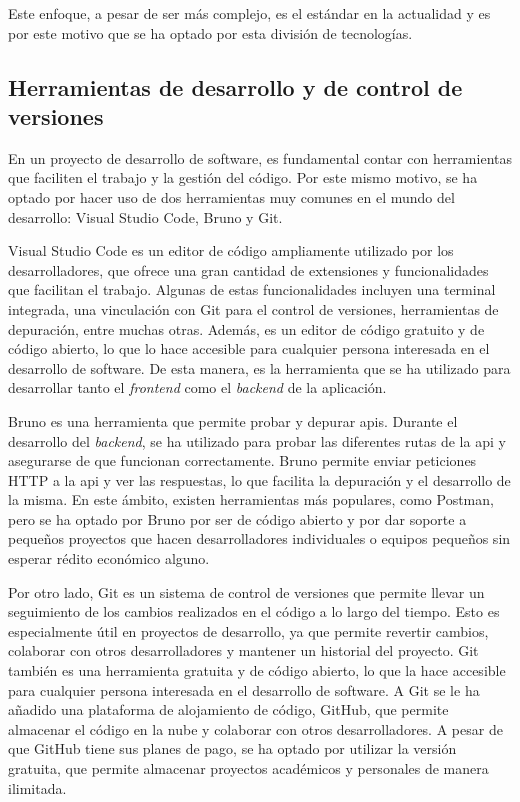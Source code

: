 Este enfoque, a pesar de ser más complejo, es el estándar en la actualidad y es por este motivo que se ha optado por esta división de tecnologías.

\subsection{Herramientas de desarrollo y de control de versiones}
\label{dev:subsec:herramientas_desarrollo}

En un proyecto de desarrollo de software, es fundamental contar con herramientas que faciliten el trabajo y la gestión del código. Por este mismo motivo, se ha optado por hacer uso de dos herramientas muy comunes en el mundo del desarrollo: Visual Studio Code, Bruno y Git.

Visual Studio Code es un editor de código ampliamente utilizado por los desarrolladores, que ofrece una gran cantidad de extensiones y funcionalidades que facilitan el trabajo. Algunas de estas funcionalidades incluyen una terminal integrada, una vinculación con Git para el control de versiones, herramientas de depuración, entre muchas otras. Además, es un editor de código gratuito y de código abierto, lo que lo hace accesible para cualquier persona interesada en el desarrollo de software. De esta manera, es la herramienta que se ha utilizado para desarrollar tanto el \textit{frontend} como el \textit{backend} de la aplicación.

Bruno es una herramienta que permite probar y depurar \gls{api}s. Durante el desarrollo del \textit{backend}, se ha utilizado para probar las diferentes rutas de la \gls{api} y asegurarse de que funcionan correctamente. Bruno permite enviar peticiones HTTP a la \gls{api} y ver las respuestas, lo que facilita la depuración y el desarrollo de la misma. En este ámbito, existen herramientas más populares, como Postman, pero se ha optado por Bruno por ser de código abierto y por dar soporte a pequeños proyectos que hacen desarrolladores individuales o equipos pequeños sin esperar rédito económico alguno.

Por otro lado, Git es un sistema de control de versiones que permite llevar un seguimiento de los cambios realizados en el código a lo largo del tiempo. Esto es especialmente útil en proyectos de desarrollo, ya que permite revertir cambios, colaborar con otros desarrolladores y mantener un historial del proyecto. Git también es una herramienta gratuita y de código abierto, lo que la hace accesible para cualquier persona interesada en el desarrollo de software. A Git se le ha añadido una plataforma de alojamiento de código, GitHub, que permite almacenar el código en la nube y colaborar con otros desarrolladores. A pesar de que GitHub tiene sus planes de pago, se ha optado por utilizar la versión gratuita, que permite almacenar proyectos académicos y personales de manera ilimitada.

